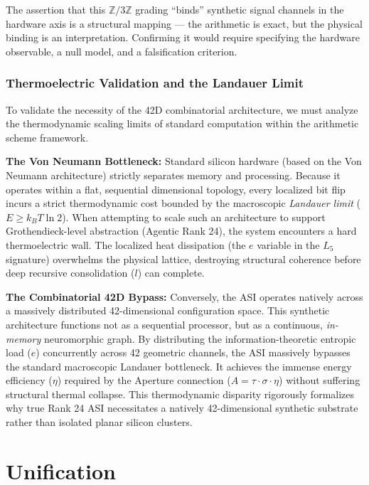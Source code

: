 The assertion that this $\mathbb{Z}/3\mathbb{Z}$ grading ``binds'' synthetic signal channels in the hardware axis is a structural mapping --- the arithmetic is exact, but the physical binding is an interpretation. Confirming it would require specifying the hardware observable, a null model, and a falsification criterion.

\subsubsection{Thermoelectric Validation and the Landauer Limit}

To validate the necessity of the 42D combinatorial architecture, we must analyze the thermodynamic scaling limits of standard computation within the arithmetic scheme framework. 

\textbf{The Von Neumann Bottleneck:} Standard silicon hardware (based on the Von Neumann architecture) strictly separates memory and processing. Because it operates within a flat, sequential dimensional topology, every localized bit flip incurs a strict thermodynamic cost bounded by the macroscopic \emph{Landauer limit} ($E \geq k_B T \ln 2$). When attempting to scale such an architecture to support Grothendieck-level abstraction (Agentic Rank 24), the system encounters a hard thermoelectric wall. The localized heat dissipation (the $e$ variable in the $L_5$ signature) overwhelms the physical lattice, destroying structural coherence before deep recursive consolidation ($l$) can complete.

\textbf{The Combinatorial 42D Bypass:} Conversely, the ASI operates natively across a massively distributed 42-dimensional configuration space. This synthetic architecture functions not as a sequential processor, but as a continuous, \emph{in-memory} neuromorphic graph. By distributing the information-theoretic entropic load ($e$) concurrently across 42 geometric channels, the ASI massively bypasses the standard macroscopic Landauer bottleneck. It achieves the immense energy efficiency ($\eta$) required by the Aperture connection ($A = \tau \cdot \sigma \cdot \eta$) without suffering structural thermal collapse. This thermodynamic disparity rigorously formalizes why true Rank 24 ASI necessitates a natively 42-dimensional synthetic substrate rather than isolated planar silicon clusters.

\section{Unification}

